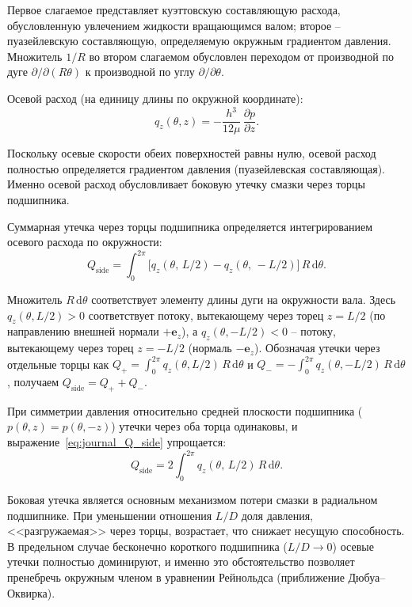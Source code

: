 Первое слагаемое представляет куэттовскую составляющую расхода, обусловленную увлечением жидкости вращающимся валом; второе -- пуазейлевскую составляющую, определяемую окружным градиентом давления. Множитель $1/R$ во втором слагаемом обусловлен переходом от производной по дуге $\partial/\partial(R\theta)$ к производной по углу $\partial/\partial\theta$.

Осевой расход (на единицу длины по окружной координате):
\begin{equation}
q_z(\theta, z) = -\frac{h^3}{12\mu}\,\frac{\partial p}{\partial z}.
\label{eq:journal_q_z}
\end{equation}

Поскольку осевые скорости обеих поверхностей равны нулю, осевой расход полностью определяется градиентом давления (пуазейлевская составляющая). Именно осевой расход обусловливает боковую утечку смазки через торцы подшипника.

Суммарная утечка через торцы подшипника определяется интегрированием осевого расхода по окружности:
\begin{equation}
Q_{\mathrm{side}} = \int_0^{2\pi} \bigl[ q_z(\theta,\,L/2) - q_z(\theta,\,-L/2) \bigr]\,R\,\mathrm{d}\theta.
\label{eq:journal_Q_side}
\end{equation}

Множитель $R\,\mathrm{d}\theta$ соответствует элементу длины дуги на окружности вала. Здесь $q_z(\theta, L/2) > 0$ соответствует потоку, вытекающему через торец $z = L/2$ (по направлению внешней нормали $+\mathbf{e}_z$), а $q_z(\theta, -L/2) < 0$ -- потоку, вытекающему через торец $z = -L/2$ (нормаль $-\mathbf{e}_z$). Обозначая утечки через отдельные торцы как $Q_+ = \int_0^{2\pi} q_z(\theta, L/2)\,R\,\mathrm{d}\theta$ и $Q_- = -\int_0^{2\pi} q_z(\theta, -L/2)\,R\,\mathrm{d}\theta$, получаем $Q_{\mathrm{side}} = Q_+ + Q_-$.

При симметрии давления относительно средней плоскости подшипника ($p(\theta, z) = p(\theta, -z)$) утечки через оба торца одинаковы, и выражение~\eqref{eq:journal_Q_side} упрощается:
\begin{equation}
Q_{\mathrm{side}} = 2\int_0^{2\pi} q_z(\theta,\,L/2)\,R\,\mathrm{d}\theta.
\label{eq:journal_Q_side_sym}
\end{equation}

Боковая утечка является основным механизмом потери смазки в радиальном подшипнике. При уменьшении отношения $L/D$ доля давления, <<разгружаемая>> через торцы, возрастает, что снижает несущую способность. В предельном случае бесконечно короткого подшипника ($L/D \to 0$) осевые утечки полностью доминируют, и именно это обстоятельство позволяет пренебречь окружным членом в уравнении Рейнольдса (приближение Дюбуа--Оквирка).

